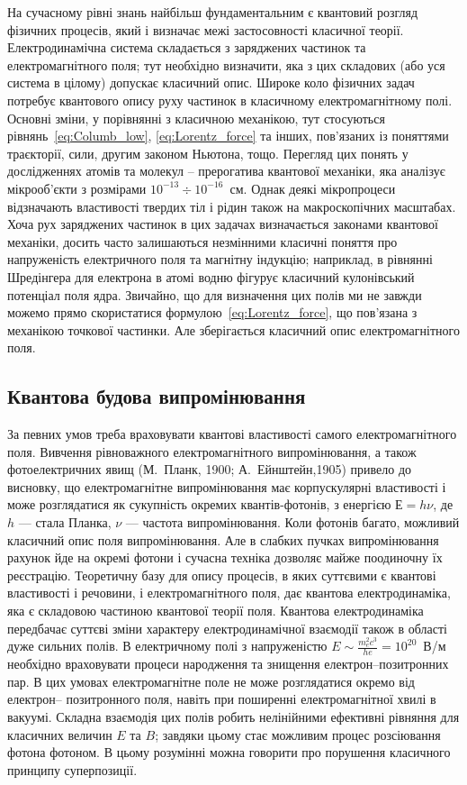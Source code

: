 На сучасному рівні знань найбільш фундаментальним є квантовий розгляд фізичних процесів, який і визначає межі застосовності класичної теорії.
Електродинамічна система складається з заряджених частинок та електромагнітного поля; тут необхідно визначити, яка з цих складових (або уся система в
цілому) допускає класичний опис. Широке коло фізичних задач потребує квантового опису руху частинок в класичному електромагнітному полі. Основні зміни,
у порівнянні з класичною механікою, тут стосуються рівнянь~\eqref{eq:Columb_low}, \eqref{eq:Lorentz_force} та інших, пов’язаних із поняттями траєкторії,
сили, другим законом Ньютона, тощо. Перегляд цих понять у дослідженнях атомів та молекул – прерогатива квантової механіки, яка аналізує мікрооб’єкти з
розмірами $10^{-13} \div 10^{-16}$~см. Однак деякі мікропроцеси відзначають властивості твердих тіл і рідин також на макроскопічних масштабах. Хоча рух
заряджених частинок в цих задачах визначається законами квантової механіки, досить часто залишаються незмінними класичні поняття про напруженість
електричного поля та магнітну індукцію; наприклад, в рівнянні Шредінгера для електрона в атомі водню фігурує класичний кулонівський потенціал поля ядра.
Звичайно, що для визначення цих полів ми не завжди можемо прямо скористатися формулою~\eqref{eq:Lorentz_force}, що пов’язана з механікою точкової
частинки. Але зберігається класичний опис електромагнітного поля.


\subsection*{Квантова будова випромінювання}

За певних умов треба враховувати квантові властивості самого електромагнітного поля. Вивчення рівноважного електромагнітного випромінювання, а також
фотоелектричних явищ (М.~Планк, 1900; А.~Ейнштейн,1905) привело до висновку, що електромагнітне випромінювання має корпускулярні властивості і може
розглядатися як сукупність окремих квантів-фотонів, з енергією $Е=h\nu$, де $h$ --- стала Планка, $\nu$ --- частота випромінювання. Коли фотонів багато,
можливий класичний опис поля випромінювання. Але в слабких пучках випромінювання рахунок йде на окремі фотони і сучасна техніка дозволяє майже
поодиночну їх реєстрацію. Теоретичну базу для опису процесів, в яких суттєвими є квантові властивості і речовини, і електромагнітного поля, дає квантова
електродинаміка, яка є складовою частиною квантової теорії поля. Квантова електродинаміка передбачає суттєві зміни характеру електродинамічної взаємодії
також в області дуже сильних полів. В електричному полі з напруженістю $E \sim \frac{m_e^2 c^3}{he} = 10^{20}$~В/м необхідно враховувати процеси
народження та знищення електрон–позитронних пар. В цих умовах електромагнітне поле не може розглядатися окремо від електрон– позитронного поля, навіть
при поширенні електромагнітної хвилі в вакуумі. Складна взаємодія цих полів робить нелінійними ефективні рівняння для класичних величин $E$ та $B$;
завдяки цьому стає можливим процес розсіювання фотона фотоном. В цьому розумінні можна говорити про порушення класичного принципу суперпозиції.



